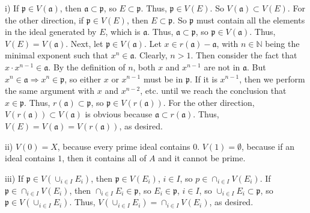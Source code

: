 \documentclass[book,12pt,oneside,openany]{memoir}
\begin{document}
i) If $\mathfrak{p} \in V(\mathfrak{a})$, then $\mathfrak{a} \subset \mathfrak{p}$, so $E \subset \mathfrak{p}$. Thus, $\mathfrak{p} \in V(E)$. So $V(\mathfrak{a}) \subset V(E)$. For the other direction, if $\mathfrak{p} \in V(E)$, then $E \subset \mathfrak{p}$. So $\mathfrak{p}$ must contain all the elements in the ideal generated by $E$, which is $\mathfrak{a}$. Thus, $\mathfrak{a} \subset \mathfrak{p}$, so $\mathfrak{p} \in V(\mathfrak{a})$. Thus, $V(E) = V(\mathfrak{a})$. Next, let $\mathfrak{p} \in V(\mathfrak{a})$. Let $x \in r(\mathfrak{a}) - \mathfrak{a}$, with $n \in \mathbb{N}$ being the minimal exponent such that $x^n \in \mathfrak{a}$. Clearly, $n > 1$. Then consider the fact that $x \cdot x^{n-1} \in \mathfrak{a}$. By the definition of $n$, both $x$ and $x^{n-1}$ are not in $\mathfrak{a}$. But $x^{n} \in \mathfrak{a} \Rightarrow x^n \in \mathfrak{p}$, so either $x$ or $x^{n-1}$ must be in $\mathfrak{p}$. If it is $x^{n-1}$, then we perform the same argument with $x$ and $x^{n-2}$, etc. until we reach the conclusion that $x \in \mathfrak{p}$. Thus, $r(\mathfrak{a}) \subset \mathfrak{p}$, so $\mathfrak{p} \in V(r(\mathfrak{a}))$. For the other direction, $V(r(\mathfrak{a})) \subset V(\mathfrak{a})$ is obvious because $\mathfrak{a} \subset r(\mathfrak{a})$. Thus, $V(E) = V(\mathfrak{a}) = V(r(\mathfrak{a}))$, as desired.

ii) $V(0) = X$, because every prime ideal contains $0$. $V(1) = \emptyset$, because if an ideal contains $1$, then it contains all of $A$ and it cannot be prime.

iii) If $\mathfrak{p} \in V(\cup_{i \in I} E_i)$, then $\mathfrak{p} \in V(E_i)$, $i \in I$, so $p \in \cap_{i \in I} V(E_i)$. If $\mathfrak{p} \in \cap_{i \in I} V(E_i)$, then $\cap_{i \in I} E_i \in \mathfrak{p}$, so $E_i \in \mathfrak{p}$, $i \in I$, so $\cup_{i \in I} E_i \subset \mathfrak{p}$, so $\mathfrak{p} \in V(\cup_{i \in I} E_i)$. Thus, $V (\cup_{i \in I} E_i ) = \cap_{i \in I} V(E_i)$, as desired.
\end{document}
